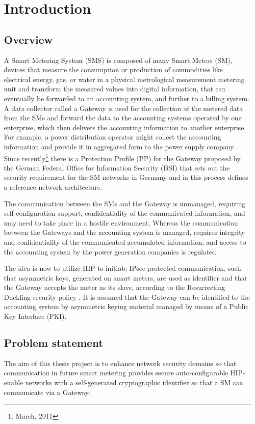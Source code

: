 \chapter{Introduction}
\section{Overview}
A Smart Metering System (SMS) is composed of many Smart Meters (SM), devices that measure the consumption or production of commodities like electrical energy, gas, or water in a physical metrological measurement metering unit and transform the measured values into digital information, that can eventually be forwarded to an accounting system, and further to a billing system. A data collector  called a Gateway is used for the collection of the metered data from the SMs and  forward the data to the accounting systems operated by one enterprise, which then delivers the accounting information to another enterprise. For example, a power distribution operator  might collect the accounting information and provide it in aggregated form to the power supply company. Since recently\footnote{March, 2011} there is a Protection Profile (PP) for the Gateway proposed by the German Federal Office for Information Security (BSI) \cite{BSI_pp} that sets out the security requirement for the SM networks in Germany and in this process defines a reference network architecture.

The communication between the SMs and the Gateway is unmanaged, requiring self-configuration support, confidentiality of the communicated information, and may need to take place in a hostile environment. Whereas the communication between the Gateways and the accounting system is managed, requires integrity and confidentiality of the communicated accumulated information, and access to the accounting system by the power generation companies is regulated.

The idea is now to utilize HIP \cite{HIP_rfc} to initiate IPsec protected communication, such that asymmetric keys, generated on smart meters, are used as identifier and that the Gateway accepts the meter as its slave, according to the Resurrecting Duckling security policy \cite{Sta_duck}. It is assumed that the Gateway can be identified to the accounting system by asymmetric keying material managed by means of a Public Key Interface (PKI).


\section{Problem statement}
The aim of this thesis project is to  enhance network security domains so that communication in future smart metering provides secure auto-configurable HIP-enable networks with  a self-generated cryptographic identifier so that a SM can communicate via a Gateway.

